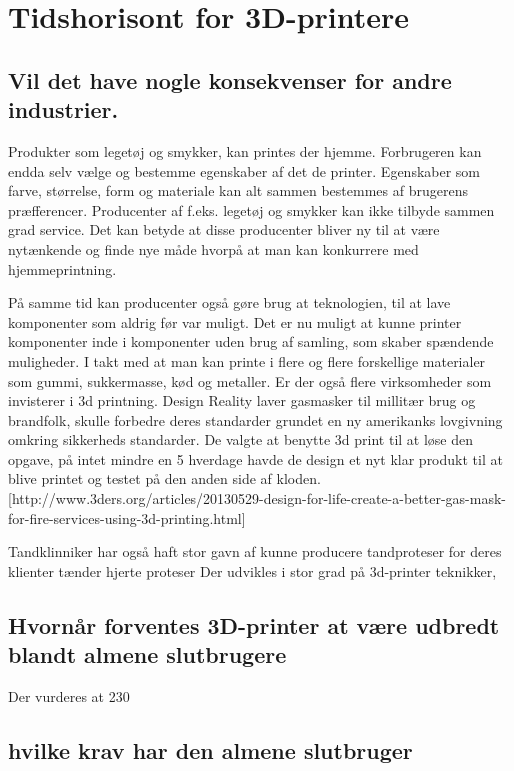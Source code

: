 
\chapter{Tidshorisont for 3D-printere}
\section{Vil det have nogle konsekvenser for andre industrier.}


Produkter som legetøj og smykker, kan printes der hjemme. Forbrugeren kan endda selv vælge og bestemme egenskaber af det de printer. Egenskaber som farve, størrelse, form og materiale kan alt sammen bestemmes af brugerens præfferencer. Producenter af f.eks. legetøj og smykker kan ikke tilbyde sammen grad service. Det kan betyde at disse producenter bliver ny til at være nytænkende og finde nye måde hvorpå at man kan konkurrere med hjemmeprintning.

På samme tid kan producenter også gøre brug at teknologien, til at lave komponenter som aldrig før var muligt. Det er nu muligt at kunne printer komponenter inde i komponenter uden brug af samling, som skaber spændende muligheder.
I takt med at man kan printe i flere og flere forskellige materialer som gummi, sukkermasse, kød og metaller. Er der også flere virksomheder som invisterer i 3d printning.
Design Reality laver gasmasker til millitær brug og brandfolk, skulle forbedre deres standarder grundet en ny amerikanks lovgivning omkring sikkerheds standarder. De valgte at benytte 3d print til at løse den opgave, på intet mindre en 5 hverdage havde de design et nyt klar produkt til at blive printet og testet på den anden side af kloden.
[http://www.3ders.org/articles/20130529-design-for-life-create-a-better-gas-mask-for-fire-services-using-3d-printing.html]

Tandklinniker har også haft stor gavn af kunne producere tandproteser for deres klienter
tænder
hjerte
proteser
 Der udvikles i stor grad på 3d-printer teknikker,  

\section{Hvornår forventes 3D-printer at være udbredt blandt almene slutbrugere}


Der vurderes at 230

\section{hvilke krav har den almene slutbruger}